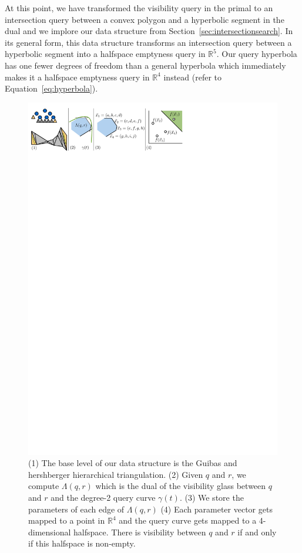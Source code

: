 \documentclass[a4paper, UKenglish]{paper}
\begin{document}
At this point, we have transformed the visibility query in the primal to an intersection query between a convex polygon and a hyperbolic segment in the dual and we implore our data structure from Section~\ref{sec:intersectionsearch}. In its general form, this data structure transforms an intersection query between a hyperbolic segment into a halfspace emptyness query in $\mathbb{R}^5$. Our query hyperbola has one fewer degrees of freedom than a general hyperbola which immediately makes it a halfspace emptyness query in $\mathbb{R}^4$ instead (refer to Equation~\ref{eq:hyperbola}).


\begin{figure}[h]
    \centering
    \includegraphics[]{../panel}
    \caption{(1) The base level of our data structure is the Guibas and hershberger hierarchical triangulation. (2) Given $q$ and $r$, we compute $\Lambda(q,r)$ which is the dual of the visibility glass between $q$ and $r$ and the degree-2 query curve $\gamma(t)$. (3) We store the parameters of each edge of $\Lambda(q,r)$ (4) Each parameter vector gets mapped to a point in $\mathbb{R}^4$ and the query curve gets mapped to a 4-dimensional halfspace. There is visibility between $q$ and $r$ if and only if this halfspace is non-empty.}
    \label{fig:panel}
\end{figure}
\end{document}
